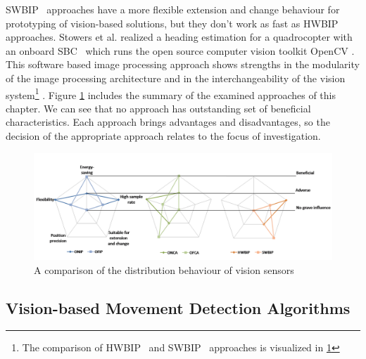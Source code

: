  \gls{SWBIP}~ approaches have a more flexible extension and change behaviour for
 prototyping of vision-based solutions, but they don't work as fast as \gls{HWBIP}~
 approaches. 
\newpage
Stowers et al. realized a heading estimation for a quadrocopter with
 an onboard \gls{SBC}~ which runs the open source computer vision toolkit
 \gls{OpenCV} .
This software based image
 processing approach shows strengths in the modularity of the image processing
 architecture and in the interchangeability of the vision system\footnote{The
 comparison of \gls{HWBIP}~ and \gls{SWBIP}~ approaches is visualized in 
\ref{fig:ComparisonVisualApproaches.png}} . Figure \ref{fig:ComparisonVisualApproaches.png} includes
 the summary of the examined approaches of this chapter. We can see that no
 approach has outstanding set of beneficial characteristics. Each approach
 brings advantages and disadvantages, so the decision of the appropriate
 approach relates to the focus of investigation.

\begin{figure}[H]
	\centering
		\includegraphics[width=1\textwidth]{graphic/ComparisonVisualApproaches2.png}
	\caption{A comparison of the distribution behaviour of vision sensors}
	\label{fig:ComparisonVisualApproaches.png}
\end{figure}

\subsection{Vision-based Movement Detection Algorithms} %


